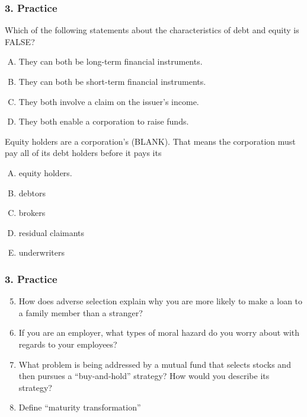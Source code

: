 \documentclass{beamer}
\begin{document}
\begin{practiceframe}[t]
    \frametitle{3. Practice}


Which of the following statements about the characteristics of debt and equity is FALSE?
\begin{enumerate}[A)]
    \item They can both be long-term financial instruments.
    \item They can both be short-term financial instruments.
    \item They both involve a claim on the issuer's income.
    \item They both enable a corporation to raise funds.
\end{enumerate}
\vspace{1em}

Equity holders are a corporation's (BLANK). That means the corporation must pay all of its debt holders before it pays its 
\begin{enumerate}[A)]
   \item equity holders.
    \item debtors
    \item brokers
    \item residual claimants
    \item underwriters
\end{enumerate}

\end{practiceframe}

\begin{practiceframe}[t]
    \frametitle{3. Practice}

    \begin{enumerate}
    \setcounter{enumi}{4}
        \item How does adverse selection explain why you are more likely to make a loan to a family member than a stranger?
        \item If you are an employer, what types of moral hazard do you worry about with regards to your employees?
        \item What problem is being addressed by a mutual fund that selects stocks and then pursues a “buy-and-hold” strategy?   How would you describe its strategy?
        \item Define “maturity transformation”
    \end{enumerate}

\end{practiceframe}
\end{document}
